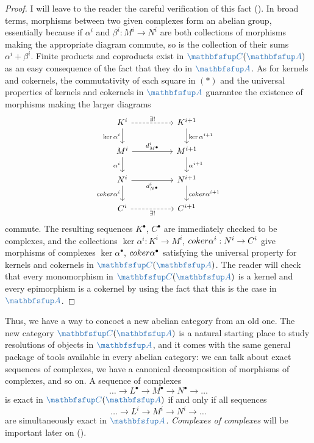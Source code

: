\begin{proof}
  I will leave to the reader the careful verification of this fact
  (). In
  broad terms, morphisms between two given complexes form an abelian
  group, essentially because if $\alpha^i$ and $\beta^i : M^i \to N^i$
  are both collections of morphisms making the appropriate diagram
  commute, so is the collection of their sums $\alpha^i +
  \beta^i$. Finite products and coproducts exist in
  $\categ{C}(\categ{A})$ as an easy consequence of the fact that they
  do in $\categ{A}$. As for kernels and cokernels, the commutativity
  of each square in $(*)$ and the universal properties of kernels and
  cokernels in $\categ{A}$ guarantee the existence of morphisms making
  the larger diagrams
  \[\begin{tikzcd}
      K^i \arrow[rr, dashed, "\exists!"] \arrow[d, "\ker\alpha^i"'] &
      & K^{i+1} \arrow[d, "\ker\alpha^{i+1}"] \\
      M^i \arrow[rr, "d^i_{M^\bullet}"] \arrow[d, "\alpha^i"'] &
      & M^{i+1} \arrow[d, "\alpha^{i+1}"] \\
      N^i \arrow[rr, "d^i_{N^\bullet}"'] \arrow[d, "\coker\alpha^i"']
      &
      & N^{i+1} \arrow[d, "\coker\alpha^{i+1}"] \\
      C^i \arrow[rr, dashed, "\exists!"'] & & C^{i+1}
    \end{tikzcd}\] commute. The resulting sequences $K^\bullet$,
  $C^\bullet$ are immediately checked to be complexes, and the
  collections $\ker\alpha^i : K^i \to M^i$,
  $coker\alpha^i : N^i \to C^i$ give morphisms of complexes
  $\ker\alpha^\bullet$, $coker\alpha^\bullet$ satisfying the
  universal property for kernels and cokernels in
  $\categ{C}(\categ{A})$. The reader will check that every
  monomorphism in $\categ{C}(\categ{A})$ is a kernel and every
  epimorphism is a cokernel by using the fact that this is the case in
  $\categ{A}$.
\end{proof}
Thus, we have a way to concoct a new abelian category from an old
one. The new category $\categ{C}(\categ{A})$ is a natural starting
place to study resolutions of objects in $\categ{A}$, and it comes
with the same general package of tools available in every abelian
category: we can talk about exact sequences of complexes, we have a
canonical decomposition of morphisms of complexes, and so on. A
sequence of complexes
\[
  \dots \longrightarrow L^\bullet \longrightarrow M^\bullet
  \longrightarrow N^\bullet \longrightarrow \dots
\]
is exact in $\categ{C}(\categ{A})$ if and only if all sequences
\[
  \dots \longrightarrow L^i \longrightarrow M^i \longrightarrow N^i
  \longrightarrow \dots
\]
are simultaneously exact in $\categ{A}$. \emph{Complexes of complexes}
will be important later on
().

